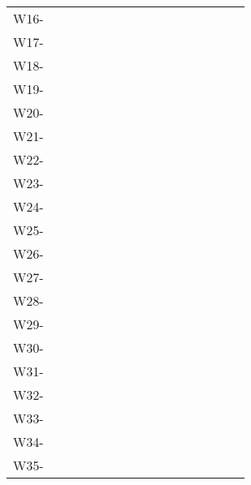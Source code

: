 \documentclass{article}
\begin{document}
\begin{table}
  \centering
  \begin{tabular}{l c c c c c c c r c c c c c c c}
    W16-\hspace{2cm}  \\
    W17-\hspace{2cm}  \\
    W18-\hspace{2cm}  \\
    W19-\hspace{2cm}  \\
    W20-\hspace{2cm}  \\
    W21-\hspace{2cm}  \\
    W22-\hspace{2cm}  \\
    W23-\hspace{2cm}  \\
    W24-\hspace{2cm}  \\
    W25-\hspace{2cm}  \\
    W26-\hspace{2cm}  \\
    W27-\hspace{2cm}  \\
    W28-\hspace{2cm}  \\
    W29-\hspace{2cm}  \\
    W30-\hspace{2cm}  \\
    W31-\hspace{2cm}  \\
    W32-\hspace{2cm}  \\
    W33-\hspace{2cm}  \\
    W34-\hspace{2cm}  \\
    W35-\hspace{2cm}  \\
  \end{tabular}
\end{table}
\end{document}
